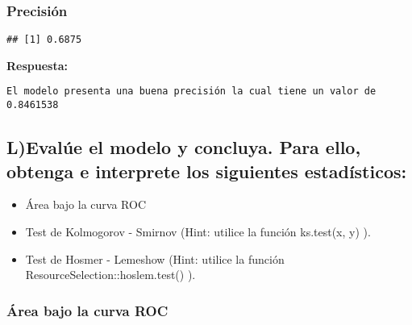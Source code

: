 \documentclass[
]{article}
\newenvironment{Shaded}{\begin{snugshade}}{\end{snugshade}}
\newcommand{\AttributeTok}[1]{\textcolor[rgb]{0.77,0.63,0.00}{#1}}
\newcommand{\ConstantTok}[1]{\textcolor[rgb]{0.00,0.00,0.00}{#1}}
\newcommand{\FunctionTok}[1]{\textcolor[rgb]{0.00,0.00,0.00}{#1}}
\newcommand{\NormalTok}[1]{#1}
\newcommand{\SpecialCharTok}[1]{\textcolor[rgb]{0.00,0.00,0.00}{#1}}
\providecommand{\tightlist}{%
  \setlength{\itemsep}{0pt}\setlength{\parskip}{0pt}}
\begin{document}
\hypertarget{precisiuxf3n}{%
\subsubsection{Precisión}\label{precisiuxf3n}}

\begin{Shaded}
\end{Shaded}

\begin{verbatim}
## [1] 0.6875
\end{verbatim}

\textbf{Respuesta:}

\begin{verbatim}
El modelo presenta una buena precisión la cual tiene un valor de 0.8461538
\end{verbatim}

\hypertarget{levaluxfae-el-modelo-y-concluya.-para-ello-obtenga-e-interprete-los-siguientes-estaduxedsticos}{%
\subsection{L)Evalúe el modelo y concluya. Para ello, obtenga e
interprete los siguientes
estadísticos:}\label{levaluxfae-el-modelo-y-concluya.-para-ello-obtenga-e-interprete-los-siguientes-estaduxedsticos}}

\begin{itemize}
\tightlist
\item
  Área bajo la curva ROC
\item
  Test de Kolmogorov - Smirnov (Hint: utilice la función ks.test(x, y)
  ).
\item
  Test de Hosmer - Lemeshow (Hint: utilice la función
  ResourceSelection::hoslem.test() ).
\end{itemize}

\hypertarget{uxe1rea-bajo-la-curva-roc}{%
\subsubsection{Área bajo la curva ROC}\label{uxe1rea-bajo-la-curva-roc}}

\begin{Shaded}
\end{Shaded}
\end{document}

